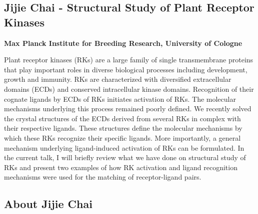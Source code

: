 \documentclass[12pt,]{book}
\begin{document}
\subsection*{Jijie Chai - Structural Study of Plant Receptor
Kinases}\label{jijie-chai---structural-study-of-plant-receptor-kinases}

\textbf{Max Planck Institute for Breeding Research, University of
Cologne}

Plant receptor kinases (RKs) are a large family of single transmembrane
proteins that play important roles in diverse biological processes
including development, growth and immunity. RKs are characterized with
diversified extracellular domains (ECDs) and conserved intracellular
kinase domains. Recognition of their cognate ligands by ECDs of RKs
initiates activation of RKs. The molecular mechanisms underlying this
process remained poorly defined. We recently solved the crystal
structures of the ECDs derived from several RKs in complex with their
respective ligands. These structures define the molecular mechanisms by
which these RKs recognize their specific ligands. More importantly, a
general mechanism underlying ligand-induced activation of RKs can be
formulated. In the current talk, I will briefly review what we have done
on structural study of RKs and present two examples of how RK activation
and ligand recognition mechanisms were used for the matching of
receptor-ligand pairs.

\subsection*{About Jijie Chai}\label{about-jijie-chai}
\end{document}
